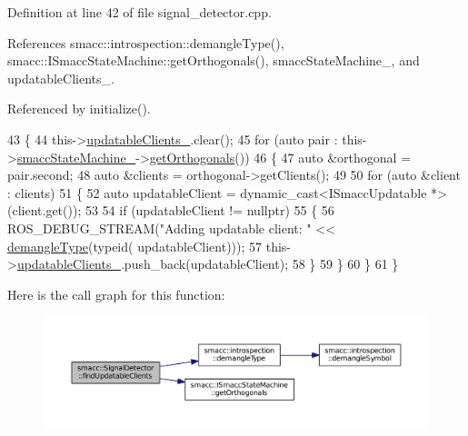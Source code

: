 Definition at line 42 of file signal\+\_\+detector.\+cpp.



References smacc\+::introspection\+::demangle\+Type(), smacc\+::\+I\+Smacc\+State\+Machine\+::get\+Orthogonals(), smacc\+State\+Machine\+\_\+, and updatable\+Clients\+\_\+.



Referenced by initialize().


\begin{DoxyCode}
43 \{
44     this->\hyperlink{classsmacc_1_1SignalDetector_a36a702afabbc335cbdb1e8699b669323}{updatableClients\_}.clear();
45     \textcolor{keywordflow}{for} (\textcolor{keyword}{auto} pair : this->\hyperlink{classsmacc_1_1SignalDetector_a46025de6ac7b5980e22144f9703236a4}{smaccStateMachine\_}->\hyperlink{classsmacc_1_1ISmaccStateMachine_a262b3f2d15af019190fa69b7c0df00f8}{getOrthogonals}())
46     \{
47         \textcolor{keyword}{auto} &orthogonal = pair.second;
48         \textcolor{keyword}{auto} &clients = orthogonal->getClients();
49 
50         \textcolor{keywordflow}{for} (\textcolor{keyword}{auto} &client : clients)
51         \{
52             \textcolor{keyword}{auto} updatableClient = \textcolor{keyword}{dynamic\_cast<}ISmaccUpdatable *\textcolor{keyword}{>}(client.get());
53 
54             \textcolor{keywordflow}{if} (updatableClient != \textcolor{keyword}{nullptr})
55             \{
56                 ROS\_DEBUG\_STREAM(\textcolor{stringliteral}{"Adding updatable client: "} << \hyperlink{namespacesmacc_1_1introspection_a81ad2fc77a0262640d4b1bd273938603}{demangleType}(\textcolor{keyword}{typeid}(
      updatableClient)));
57                 this->\hyperlink{classsmacc_1_1SignalDetector_a36a702afabbc335cbdb1e8699b669323}{updatableClients\_}.push\_back(updatableClient);
58             \}
59         \}
60     \}
61 \}
\end{DoxyCode}


Here is the call graph for this function\+:
\nopagebreak
\begin{figure}[H]
\begin{center}
\leavevmode
\includegraphics[width=350pt]{classsmacc_1_1SignalDetector_a47ec2df560e2e33758ce3975bece9385_cgraph}
\end{center}
\end{figure}





